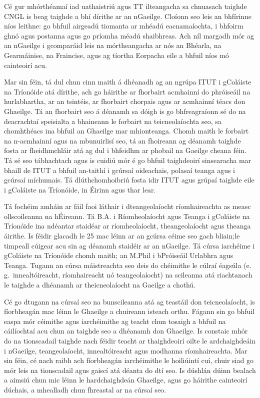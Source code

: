 \begin{multicols}{2}
Cé gur mhórthéamaí iad uathaistriú agus TT ilteangacha sa chnuasach taighde CNGL is beag taighde a bhí dírithe ar an nGaeilge. Cloíonn seo leis an bhfírinne níos leithne: go bhfuil airgeadú tiomanta ar mhéadú eacnamaíochta, i bhfoirm ghnó agus postanna agus go príomha méadú shaibhreas. Ach níl margadh mór ag an nGaeilge i gcomparáid leis na mórtheangacha ar nós an Bhéarla, na Gearmáinise, na Fraincise, agus ag tíortha Eorpacha eile a bhfuil níos mó cainteoirí acu. 

Mar sin féin, tá dul chun cinn maith á dhéanadh ag an ngrúpa ITUT i gColáiste na Tríonóide atá dírithe, ach go háirithe ar fhorbairt acmhainní do phróiseáil na hurlabhartha, ar an tsintéis, ar fhorbairt chorpais agus ar acmhainní téacs don Ghaeilge. Tá an fhorbairt seo á déanamh sa dóigh is go bhfreagraíonn sé do na deacrachtaí speisialta a bhaineann le forbairt na teicneolaíochta seo, sa chomhthéacs ina bhfuil an Ghaeilge mar mhionteanga. Chomh maith le forbairt na n-acmhainní agus na mbunuirlisí seo, tá an fhoireann ag déanamh taighde fosta ar fheidhmchláir atá ag dul i bhfeidhm ar phobail na Gaeilge cheana féin. Tá sé seo tábhachtach agus is cuidiú mór é go bhfuil taighdeoirí sinsearacha mar bhaill de ITUT a bhfuil an-taithí i gcúrsaí oideachais, polasaí teanga agus i gcúrsaí míchumais. Tá dlúthchomhoibriú fosta idir ITUT agus grúpaí taighde eile i gColáiste na Tríonóide, in Éirinn agus thar lear.

Tá fochéim amháin ar fáil faoi láthair i dteangeolaíocht ríomhaireachta as measc ollscoileanna na hÉireann. Tá B.A. i Ríomheolaíocht  agus  Teanga i  gColáiste na Tríonóide ina ndéantar staidéar ar ríomheolaíocht, theangeolaíocht agus theanga áirithe. Is féidir glacadh le 25 mac léinn ar an gcúrsa céime seo gach bliain;le timpeall cúigear acu sin ag déanamh staidéir ar an nGaeilge. Tá cúrsa iarchéime i gColáiste na Tríonóide chomh maith; an M.Phil i bPróiseáil Urlabhra agus Teanga. Tugann an cúrsa máistreachta seo deis do chéimithe le cúlraí éagsúla (e.\,g.~innealtóireacht, ríomhaireacht nó teangeolaíocht) na scileanna atá riachtanach le taighde a dhéanamh ar theicneolaíocht na Gaeilge a chothú.

Cé go dtugann na cúrsaí seo na bunscileanna atá ag teastáil don teicneolaíocht, is fíorbheagán mac léinn le Ghaeilge a chuireann isteach orthu. Fágann sin go bhfuil easpa mór céimithe agus iarchéimithe  ag teacht chun tosaigh a bhfuil na cáilíochtaí acu chun an taighde seo a dhéanamh don Ghaeilge. Is constaic mhór do na tionscadail taighde nach féidir teacht ar thaighdeoirí oilte le ardchaighdeáin i nGaeilge, teangeolaíocht, innealtóireacht agus modhanna ríomhaireachta. Mar sin féin, cé nach raibh ach fíorbheagán iarchéimithe le hoiliúintí cuí, chuir siad go mór leis na tionscadail agus gaiscí atá déanta do dtí seo. Is dúshlán dúinn bealach a aimsiú chun mic léinn le hardchaighdeán Ghaeilge, agus go háirithe cainteoirí dúchais, a mhealladh chun fhreastal ar na cúrsaí seo.


\end{multicols}
